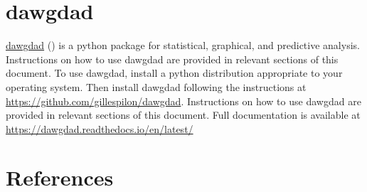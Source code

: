 \documentclass[10pt, letterpaper, twoside]{article}
\begin{document}
\section{dawgdad}\label{sec:dawgdad}
\href{https://github.com/gillespilon/dawgdad}{dawgdad} (\cite{dawgdad}) is a \Gls{python} package for statistical, graphical, and predictive analysis. Instructions on how to use dawgdad are provided in relevant sections of this document. To use dawgdad, install a \Gls{python} distribution appropriate to your operating system. Then install dawgdad following the instructions  at \href{https://github.com/gillespilon/dawgdad}{https://github.com/gillespilon/dawgdad}.
Instructions on how to use dawgdad are provided in relevant sections of this document.
Full documentation is available at \href{https://dawgdad.readthedocs.io/en/latest/}{https://dawgdad.readthedocs.io/en/latest/}
\newpage
\printunsrtglossary[type={abbreviations}]
\newpage
\printunsrtglossary[style={indexgroup}]
\newpage
\section{References}\label{sec:references}
\printbibliography[heading=none]
\end{document}
